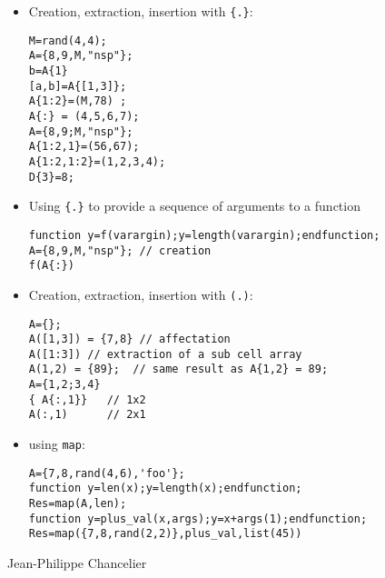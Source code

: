 \begin{examples}
\begin{itemize}
\item Creation, extraction, insertion with \verb+{.}+:
\begin{Verbatim}
M=rand(4,4);
A={8,9,M,"nsp"};  
b=A{1} 	
[a,b]=A{[1,3]};
A{1:2}=(M,78) ; 
A{:} = (4,5,6,7); 
A={8,9;M,"nsp"};  
A{1:2,1}=(56,67);
A{1:2,1:2}=(1,2,3,4);
D{3}=8;
\end{Verbatim}

\item Using \verb+{.}+ to provide a sequence of arguments to a function
\begin{Verbatim} 
function y=f(varargin);y=length(varargin);endfunction;
A={8,9,M,"nsp"}; // creation 
f(A{:})
\end{Verbatim}
\item Creation, extraction, insertion with \verb+(.)+:
\begin{Verbatim}
A={}; 
A([1,3]) = {7,8} // affectation 
A([1:3]) // extraction of a sub cell array
A(1,2) = {89};  // same result as A{1,2} = 89;
A={1,2;3,4}
{ A{:,1}}   // 1x2 
A(:,1)      // 2x1 
\end{Verbatim}

\item using \verb+map+:
\begin{Verbatim}
A={7,8,rand(4,6),'foo'}; 
function y=len(x);y=length(x);endfunction;
Res=map(A,len);
function y=plus_val(x,args);y=x+args(1);endfunction;
Res=map({7,8,rand(2,2)},plus_val,list(45))
\end{Verbatim}
\end{itemize}

\end{examples}

\begin{manseealso}

\end{manseealso}

\begin{authors}
  Jean-Philippe Chancelier
\end{authors}






